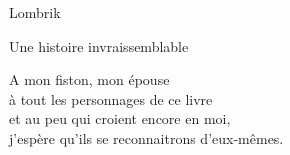 \documentclass[10pt,b5paper]{report}
\author{Drunken Kiwi}
\begin{document}
\Fontlukas

\begin{titlepage}
    \vspace*{\fill}
	\begin{center}
	\begin{Huge}
	Lombrik
	\end{Huge}

	Une histoire invraissemblable
	\end{center}
	\vspace*{\fill}
\end{titlepage}

\vspace*{\fill}
\begin{flushright}

A mon fiston, mon épouse \\à tout les personnages de ce livre \\ et au peu qui croient encore en moi,\\ j'espère qu'ils se reconnaitrons d'eux-mêmes.
\end{flushright}



\tableofcontents
\end{document}
